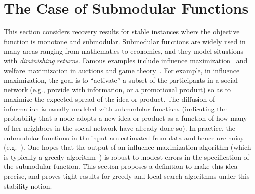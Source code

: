 \section{The Case of Submodular Functions}\label{sec:submodular}

This section considers recovery results for stable instances where the
objective function is monotone and submodular. Submodular functions
are widely used in many areas ranging from mathematics to economics,
and they model situations with \textit{diminishing
  returns}. Famous examples include influence
maximization~\cite{kempe2003maximizing,mossel2007submodularity,
  easley2010networks, chen2009efficient} and welfare maximization in
auctions and game theory~\cite{lehmann2001combinatorial,
  nisan2007computationally}. For example, in influence maximization,
the goal is to ``activate'' a subset of the participants in a social 
network (e.g., provide with information, or a promotional product) so as to
maximize the expected spread of the idea or product.
The diffusion of information is usually modeled with submodular
functions (indicating the probability that a node adopts a new idea or
product as a function of how many of her neighbors in the social
network have already done so).
In practice, the submodular functions in the input are estimated from
data and hence are noisy (e.g.~\cite{backstrom2006group}).  One hopes that the output of an influence
maximization algorithm (which is typically a greedy
algorithm~\cite{kempe2003maximizing}) is robust to modest errors in
the specification of the submodular function.  This section proposes a
definition to make this idea precise, and proves tight results for greedy
and local search algorithms under this stability notion.




